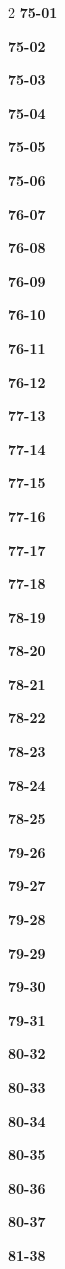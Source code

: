 \documentclass[10pt,a4paper]{article}
\begin{document}
\begin{multicols}{2}
\noindent\textbf{75-01}\ \par
\noindent\textbf{75-02}\ \par
\noindent\textbf{75-03}\ \par
\noindent\textbf{75-04}\ \par
\noindent\textbf{75-05}\ \par
\noindent\textbf{75-06}\ \par
\noindent\textbf{76-07}\ \par
\noindent\textbf{76-08}\ \par
\noindent\textbf{76-09}\ \par
\noindent\textbf{76-10}\ \par
\noindent\textbf{76-11}\ \par
\noindent\textbf{76-12}\ \par
\noindent\textbf{77-13}\ \par
\noindent\textbf{77-14}\ \par
\noindent\textbf{77-15}\ \par
\noindent\textbf{77-16}\ \par
\noindent\textbf{77-17}\ \par
\noindent\textbf{77-18}\ \par
\noindent\textbf{78-19}\ \par
\noindent\textbf{78-20}\ \par
\noindent\textbf{78-21}\ \par
\noindent\textbf{78-22}\ \par
\noindent\textbf{78-23}\ \par
\noindent\textbf{78-24}\ \par
\noindent\textbf{78-25}\ \par
\noindent\textbf{79-26}\ \par
\noindent\textbf{79-27}\ \par
\noindent\textbf{79-28}\ \par
\noindent\textbf{79-29}\ \par
\noindent\textbf{79-30}\ \par
\noindent\textbf{79-31}\ \par
\noindent\textbf{80-32}\ \par
\noindent\textbf{80-33}\ \par
\noindent\textbf{80-34}\ \par
\noindent\textbf{80-35}\ \par
\noindent\textbf{80-36}\ \par
\noindent\textbf{80-37}\ \par
\noindent\textbf{81-38}\ \par

\end{multicols}
\end{document}
